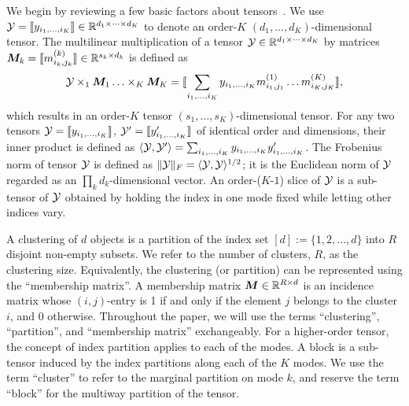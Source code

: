 \documentclass[11pt]{article}
\theoremstyle{plain}
\theoremstyle{definition}
\begin{document}
We begin by reviewing a few basic factors about tensors~\cite{kolda2009tensor}. We use $\mathcal{Y}=\llbracket y_{i_1,\ldots,i_K} \rrbracket\in \mathbb{R}^{d_1\times \cdots\times d_K}$ to denote an order-$K$ $(d_1,\ldots,d_K)$-dimensional tensor. The multilinear multiplication of a tensor $\mathcal{Y}\in\mathbb{R}^{d_1\times \cdots\times d_K}$ by matrices $\bm M_k=\llbracket m_{i_k,j_k}^{(k)} \rrbracket\in\mathbb{R}^{s_k\times d_k}$ is defined as
\[
\mathcal{Y} \times_1\bm M_1\ldots \times_K \bm M_K=\llbracket \sum_{i_1,\ldots,i_K}y_{i_1,\ldots,i_K}m_{i_1,j_1}^{(1)}\ldots m_{i_K,j_K}^{(K)} \rrbracket,
\]
which results in an order-$K$ tensor $(s_1,\ldots,s_K)$-dimensional tensor. For any two tensors $\mathcal{Y}=\llbracket y_{i_1,\ldots,i_K} \rrbracket$, $\mathcal{Y}'=\llbracket y'_{i_1,\ldots,i_K} \rrbracket$ of identical order and dimensions, their inner product is defined as $\langle \mathcal{Y}, \mathcal{Y}'\rangle =\sum_{i_1,\ldots,i_K}y_{i_1,\ldots,i_K}y'_{i_1,\ldots,i_K}$. The Frobenius norm of tensor $\mathcal{Y}$ is defined as $\lVert\mathcal{Y}\rVert_F=\langle \mathcal{Y}, \mathcal{Y} \rangle^{1/2}$; it is the Euclidean norm of $\mathcal{Y}$ regarded as an $\prod_k d_k$-dimensional vector. An order-($K$-$1$) slice of $\mathcal{Y}$ is a sub-tensor of $\mathcal{Y}$ obtained by holding the index in one mode fixed while letting other indices vary. 

A clustering of $d$ objects is a partition of the index set $[d]:=\{1,2,\ldots,d\}$ into $R$ disjoint non-empty subsets. We refer to the number of clusters, $R$, as the clustering size. Equivalently, the clustering (or partition) can be represented using the ``membership matrix''. A membership matrix $\bm M\in\mathbb{R}^{R\times d}$ is an incidence matrix whose $(i,j)$-entry is 1 if and only if the element $j$ belongs to the cluster $i$, and 0 otherwise. Throughout the paper, we will use the terms ``clustering'', ``partition'', and ``membership matrix'' exchangeably. For a higher-order tensor, the concept of index partition applies to each of the modes. A block is a sub-tensor induced by the index partitions along each of the $K$ modes. We use the term ``cluster'' to refer to the marginal partition on mode $k$, and reserve the term ``block'' for the multiway partition of the tensor. 

\end{document}
